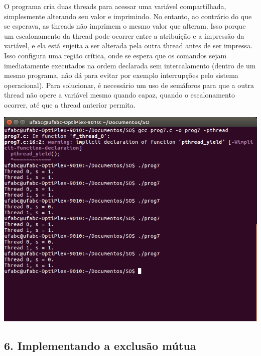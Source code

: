 O programa cria duas threads para acessar uma variável compartilhada, simplesmente alterando seu valor e imprimindo. No entanto, ao contrário do que se esperava, as threads não imprimem o mesmo valor que alteram. Isso porque um escalonamento da thread pode ocorrer entre a atribuição e a impressão da variável, e ela está sujeita a ser alterada pela outra thread antes de ser impressa. Isso configura uma região crítica, onde se espera que os comandos sejam imediatamente executados na ordem declarada sem intercalamento (dentro de um mesmo programa, não dá para evitar por exemplo interrupções pelo sistema operacional). Para solucionar, é necessário um uso de semáforos para que a outra thread não opere a variável mesmo quando capaz, quando o escalonamento ocorrer, até que a thread anterior permita.

\vspace{2em}
\begin{minipage}{\textwidth}
    \hspace{-1em}
    \centering
    \includegraphics[trim=0 110 0 0,clip,scale=.4]{pratica1/prog7.png}
    \label{prog4modpng}
    \hspace{1em}
\end{minipage}

\subsection*{6. Implementando a exclusão mútua}

